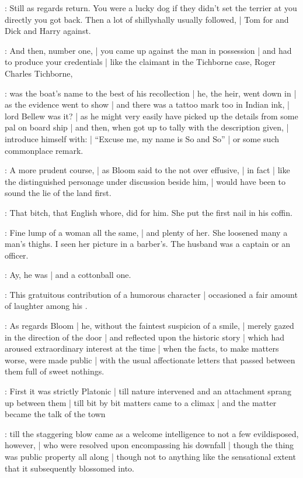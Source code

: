 :
Still as regards return.
You were a lucky dog if they didn't set the terrier at you directly you got back.
Then a lot of shillyshally usually followed, |
Tom for and Dick and Harry against.

:
And then, number one, |
you came up against the man in possession |
and had to produce your credentials |
like the claimant in the Tichborne case, Roger Charles Tichborne,

:
 was the boat's name to the best of his recollection |
he, the heir, went down in |
as the evidence went to show |
and there was a tattoo mark too in Indian ink, |
lord Bellew was it? |
as he might very easily have picked up the details from some pal on board ship |
and then, when got up to tally with the description given, |
introduce himself with: |
``Excuse me, my name is So and So'' |
or some such commonplace remark.

:
A more prudent course, |
as Bloom said to the not over effusive, |
in fact |
like the distinguished personage under discussion beside him, |
would have been to sound the lie of the land first.

\SkinTheGoat:
That bitch, that English whore, did for him.
She put the first nail in his coffin.

\Campbell:
Fine lump of a woman all the same, |
and plenty of her.
She loosened many a man's thighs.
I seen her picture in a barber's.
The husband was a captain or an officer.

\SkinTheGoat:
Ay,
he was |
and a cottonball one.

:
This gratuitous contribution of a humorous character |
occasioned a fair amount of laughter among his .

:
As regards Bloom |
he, without the faintest suspicion of a smile, |
merely gazed in the direction of the door |
and reflected upon the historic story |
which had aroused extraordinary interest at the time |
when the facts, to make matters worse, were made public |
with the usual affectionate letters that passed between them full of sweet nothings.

:
First it was strictly Platonic |
till nature intervened and an attachment sprang up between them |
till bit by bit matters came to a climax |
and the matter became the talk of the town

:
till the staggering blow came as a welcome intelligence
to not a few evildisposed, however, |
who were resolved upon encompassing his downfall |
though the thing was public property all along |
though not to anything like the sensational extent that it subsequently blossomed into.

